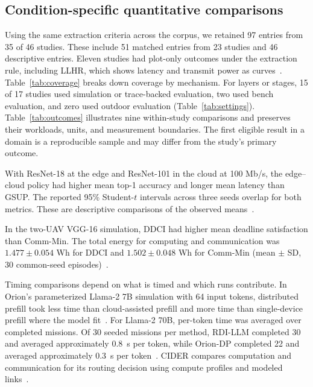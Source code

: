 \documentclass[journal]{IEEEtran}
\begin{document}
\subsection{Condition-specific quantitative comparisons}
Using the same extraction criteria across the corpus, we retained 97 entries from 35 of 46 studies. These include 51 matched entries from 23 studies and 46 descriptive entries. Eleven studies had plot-only outcomes under the extraction rule, including LLHR, which shows latency and transmit power as curves~\cite{R0082}. Table~\ref{tab:coverage} breaks down coverage by mechanism. For layers or stages, 15 of 17 studies used simulation or trace-backed evaluation, two used bench evaluation, and zero used outdoor evaluation (Table~\ref{tab:settings}). Table~\ref{tab:outcomes} illustrates nine within-study comparisons and preserves their workloads, units, and measurement boundaries. The first eligible result in a domain is a reproducible sample and may differ from the study's primary outcome.

With ResNet-18 at the edge and ResNet-101 in the cloud at 100 Mb/s, the edge--cloud policy had higher mean top-1 accuracy and longer mean latency than GSUP. The reported 95\% Student-$t$ intervals across three seeds overlap for both metrics. These are descriptive comparisons of the observed means~\cite{R0080}.\par In the two-UAV VGG-16 simulation, DDCI had higher mean deadline satisfaction than Comm-Min. The total energy for computing and communication was $1.477\pm0.054$ Wh for DDCI and $1.502\pm0.048$ Wh for Comm-Min (mean $\pm$ SD, 30 common-seed episodes)~\cite{R0092}.

Timing comparisons depend on what is timed and which runs contribute. In Orion's parameterized Llama-2 7B simulation with 64 input tokens, distributed prefill took less time than cloud-assisted prefill and more time than single-device prefill where the model fit~\cite{R0074}. For Llama-2 70B, per-token time was averaged over completed missions. Of 30 seeded missions per method, RDI-LLM completed 30 and averaged approximately 0.8~s per token, while Orion-DP completed 22 and averaged approximately 0.3~s per token~\cite{R0110}. CIDER compares computation and communication for its routing decision using compute profiles and modeled links~\cite{R0075}.
\end{document}
